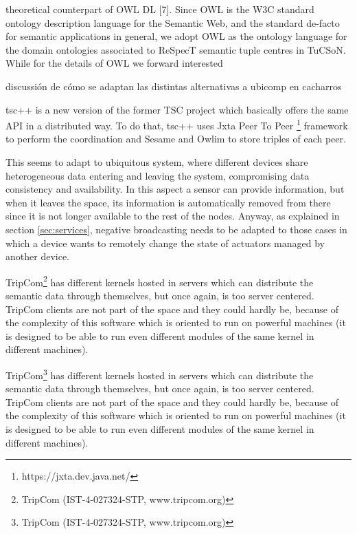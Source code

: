 

theoretical counterpart of OWL DL [7]. Since OWL is the W3C standard ontology description language for the Semantic Web,
and the standard de-facto for semantic applications in general, we adopt OWL as the ontology language for the domain
ontologies associated to ReSpecT semantic tuple centres in TuCSoN. While for the details of OWL we forward interested


discussión de cómo se adaptan las distintas alternativas a ubicomp en cacharros



tsc++ \cite{krummenacher_open_2009} is a new version of the former TSC project\cite{fensel_triple-space_2004} which basically offers
the same API in a distributed way. To do that, tsc++ uses Jxta Peer To Peer \footnote{https://jxta.dev.java.net/} framework to perform the
coordination and Sesame \cite{broekstra_sesame:_2002} and Owlim \cite{kiryakov_owlimpragmatic_2005} to store triples of each peer.

This seems to adapt to
ubiquitous system, where different devices share heterogeneous data entering and leaving the system, compromising data consistency
and availability. In this aspect a sensor can provide information, but when it leaves the space, its information is automatically
removed from there since it is not longer available to the rest of the nodes. Anyway, as explained in section \ref{sec:services},
negative broadcasting needs to be adapted to those cases in which a device wants to remotely change the state of actuators managed
by another device.


TripCom\footnote{TripCom (IST-4-027324-STP, www.tripcom.org)} has different kernels hosted in servers which can distribute the semantic data
through themselves, but once again, is too server centered. TripCom clients are not part of the space and they could hardly be, because of
the complexity of this software which is oriented to run on powerful machines (it is designed to be able to run even different modules of the
same kernel in different machines).

TripCom\footnote{TripCom (IST-4-027324-STP, www.tripcom.org)} has different kernels hosted in servers which can distribute the semantic data
through themselves, but once again, is too server centered. TripCom clients are not part of the space and they could hardly be, because of
the complexity of this software which is oriented to run on powerful machines (it is designed to be able to run even different modules of the
same kernel in different machines).

